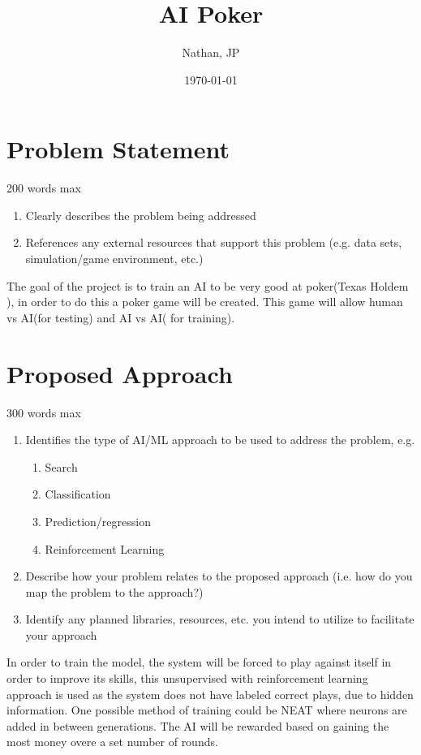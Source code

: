 \documentclass[11pt]{article}
\title{AI Poker}
\author{Nathan, JP}
\date{\today}
\begin{document}
\maketitle
\section{Problem Statement}
200 words max
\begin{enumerate}
\item Clearly describes the problem being addressed
\item References any external resources that support this problem (e.g. data sets, simulation/game environment,
  etc.)
\end{enumerate}

The goal of the project is to train an AI to be very good at poker(Texas Holdem \cite{TexasHoldEm}),
in order to do this a poker game will be created. This game will allow human vs AI(for testing) and AI vs AI(
for training).

\section{Proposed Approach}
300 words max
\begin{enumerate}
\item Identifies the type of AI/ML approach to be used to address the problem, e.g.
  \begin{enumerate}
  \item Search
  \item Classification
  \item Prediction/regression
  \item Reinforcement Learning
  \end{enumerate}
\item Describe how your problem relates to the proposed approach (i.e. how do you map the problem to the
  approach?)
\item Identify any planned libraries, resources, etc. you intend to utilize to facilitate your approach
\end{enumerate}
In order to train the model, the system will be forced to play against itself in order to improve its skills,
this unsupervised with reinforcement learning approach is used as the system does not have labeled correct plays,
due to hidden information. One possible method of training could be NEAT\cite{NEAT} where neurons are added in
between generations. The AI will be rewarded based on gaining the most money overe a set number of rounds. 
\end{document}
